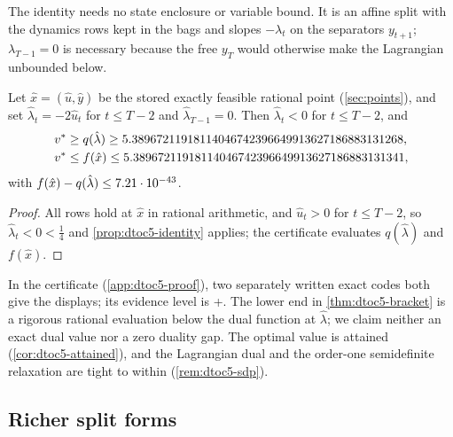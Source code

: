 The identity needs no state enclosure or variable bound. It is an affine split with the dynamics rows kept in the bags and slopes $-\lambda_t$ on the separators $y_{t+1}$; $\lambda_{T-1}=0$ is necessary because the free $y_T$ would otherwise make the Lagrangian unbounded below.

\begin{theorem}\label{thm:dtoc5-bracket}
Let $\hat x=(\hat u,\hat y)$ be the stored exactly feasible rational point (\cref{sec:points}), and set $\hat\lambda_t=-2\hat u_t$ for $t\le T-2$ and $\hat\lambda_{T-1}=0$.
Then $\hat\lambda_t<0$ for $t\le T-2$, and
\begin{align*}
  v^{*}&\ge q(\hat\lambda)\ge5.38967211918114046742396649913627186883131268,\\
  v^{*}&\le f(\hat x)\le5.38967211918114046742396649913627186883131341,
\end{align*}
with $f(\hat x)-q(\hat\lambda)\le7.21\cdot 10^{-43}$.
\end{theorem}

\begin{proof}
All rows hold at $\hat x$ in rational arithmetic, and $\hat u_t>0$ for $t\le T-2$, so $\hat\lambda_t<0<\frac14$ and \cref{prop:dtoc5-identity} applies; the certificate evaluates $q(\hat\lambda)$ and $f(\hat x)$.
\end{proof}

In the certificate (\cref{app:dtoc5-proof}), two separately written exact codes  both give the displays; its evidence level is +.
The lower end in \cref{thm:dtoc5-bracket} is a rigorous rational evaluation below the dual function at $\hat\lambda$; we claim neither an exact dual value nor a zero duality gap.
The optimal value is attained (\cref{cor:dtoc5-attained}), and the Lagrangian dual and the order-one semidefinite relaxation are tight to within  (\cref{rem:dtoc5-sdp}).

\subsection{Richer split forms}\label{sec:split-richer}

